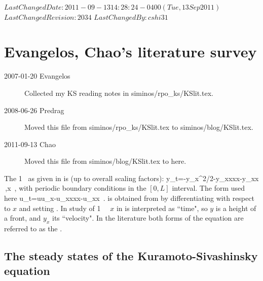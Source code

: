 \ifsvnmulti
{}
{$LastChangedDate: 2011-09-13 14:28:24 -0400 (Tue, 13 Sep 2011) $}
{$LastChangedRevision: 2034 $} {$LastChangedBy: cshi31 $}
\fi


\section{Evangelos, Chao's literature survey}
\label{sec:KSlit}

\begin{description}

\item[2007-01-20 Evangelos]
Collected my KS reading notes in siminos/rpo\_ks/KSlit.tex.

\item[2008-06-26 Predrag]
Moved this file from siminos/rpo\_ks/KSlit.tex to
siminos/blog/KSlit.tex.

\item[2011-09-13 Chao]
Moved this file from siminos/blog/KSlit.tex to here.

\end{description}


The {1\dmn} \KSe\
as given in  is (up to overall scaling factors):
\beq
    y_t=-y_x^2/2-y_{xxxx}-y_{xx}
\,,\qquad       x \in [0,L]
\,,
    \label{eq:KSeOR}
\eeq
with periodic boundary conditions in the $[0,L]$ interval. The form used
here
\beq
    u_t=uu_x-u_{xxxx}-u_{xx}
\,.
    \label{eq:KSeAP}
\eeq
is obtained from  by differentiating with respect to $x$
and setting \PCedit{$u=-y_x$}.
In study of {1\dmn} \KS\ \eqva\ $x$ in 
is interpreted as ``time", so $y$ is a height of a front, and $y_x$ its ``velocity".
In the literature  both forms of the equation are
referred to as the \KSe.

\subsection{The steady states of the {Kuramoto-Sivashinsky} equation}
\label{s:ksgreene88}


